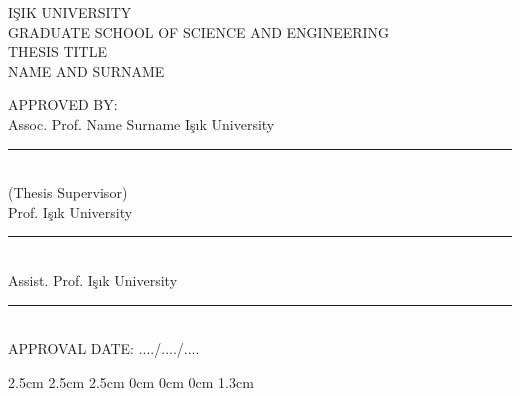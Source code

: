 \thispagestyle{empty}
\begin{center}
\vspace*{-0.9cm}
I\c{S}IK UNIVERSITY \\ 
GRADUATE SCHOOL OF SCIENCE AND ENGINEERING \\[4cm]
THESIS TITLE\\[3cm]
NAME AND SURNAME\\[3cm]
\end{center} 
\begin{flushleft}
APPROVED BY:\\[1.5cm]

Assoc. Prof. Name Surname \hspace{0.85cm} I\c{s}{\i}k University
\hspace{1cm}\rule[0em]{8em}{0.5pt}\\[0.2cm](Thesis Supervisor)\\[1.2cm]

Prof. \hspace{2.9cm}I\c{s}{\i}k
University\hspace{1.1cm}\rule[0em]{8em}{0.5pt}\\[2cm]

Assist. Prof. \hspace{1.8cm} I\c{s}{\i}k University 
\hspace{0.9cm}\rule[0em]{8em}{0.5pt}\\[3cm]

APPROVAL DATE:
\hspace{2.2cm} ..../..../....
\end{flushleft}
\setmarginsrb           {4cm}  %
                        {2.5cm}  %
                        {2.5cm}  %
                        {2.5cm}  %
                        {0cm}  %
                        {0cm}  %
                        {0cm}  %
                        {1.3cm}  %

